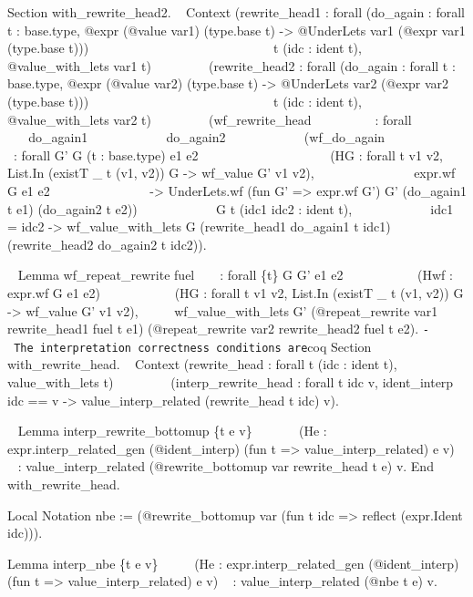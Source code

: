 \begin{itemize}
  Section with\_rewrite\_head2. ~ Context (rewrite\_head1 : forall
  (do\_again : forall t : base.type, @expr (@value var1) (type.base t)
  -\textgreater{} @UnderLets var1 (@expr var1 (type.base t))) ~ ~ ~ ~ ~
  ~ ~ ~ ~ ~ ~ ~ ~ ~ ~ ~ ~ t (idc : ident t), @value\_with\_lets var1 t)
  ~ ~ ~ ~ ~ (rewrite\_head2 : forall (do\_again : forall t : base.type,
  @expr (@value var2) (type.base t) -\textgreater{} @UnderLets var2
  (@expr var2 (type.base t))) ~ ~ ~ ~ ~ ~ ~ ~ ~ ~ ~ ~ ~ ~ ~ ~ ~ t (idc :
  ident t), @value\_with\_lets var2 t) ~ ~ ~ ~ ~ (wf\_rewrite\_head ~ ~
  ~ ~ ~ ~: forall ~ ~ ~ ~ ~ ~ ~ do\_again1 ~ ~ ~ ~ ~ ~ ~ do\_again2 ~ ~
  ~ ~ ~ ~ ~ (wf\_do\_again ~ ~ ~ ~ ~ ~ ~ ~: forall G' G (t : base.type)
  e1 e2 ~ ~ ~ ~ ~ ~ ~ ~ ~ ~ ~ ~ (HG : forall t v1 v2, List.In (existT \_
  t (v1, v2)) G -\textgreater{} wf\_value G' v1 v2), ~ ~ ~ ~ ~ ~ ~ ~ ~
  expr.wf G e1 e2 ~ ~ ~ ~ ~ ~ ~ ~ ~ -\textgreater{} UnderLets.wf (fun G'
  =\textgreater{} expr.wf G') G' (do\_again1 t e1) (do\_again2 t e2)) ~
  ~ ~ ~ ~ ~ ~ G t (idc1 idc2 : ident t), ~ ~ ~ ~ ~ ~ ~ idc1 = idc2
  -\textgreater{} wf\_value\_with\_lets G (rewrite\_head1 do\_again1 t
  idc1) (rewrite\_head2 do\_again2 t idc2)).

  ~ Lemma wf\_repeat\_rewrite fuel ~ ~ : forall \{t\} G G' e1 e2 ~ ~ ~ ~
  ~ ~ ~(Hwf : expr.wf G e1 e2) ~ ~ ~ ~ ~ ~ ~(HG : forall t v1 v2,
  List.In (existT \_ t (v1, v2)) G -\textgreater{} wf\_value G' v1 v2),
  ~ ~ ~ wf\_value\_with\_lets G' (@repeat\_rewrite var1 rewrite\_head1
  fuel t e1) (@repeat\_rewrite var2 rewrite\_head2 fuel t e2).
  \texttt{-\ The\ interpretation\ correctness\ conditions\ are}coq
  Section with\_rewrite\_head. ~ Context (rewrite\_head : forall t (idc
  : ident t), value\_with\_lets t) ~ ~ ~ ~ ~ (interp\_rewrite\_head :
  forall t idc v, ident\_interp idc == v -\textgreater{}
  value\_interp\_related (rewrite\_head t idc) v).

  ~ Lemma interp\_rewrite\_bottomup \{t e v\} ~ ~ ~ ~ (He :
  expr.interp\_related\_gen (@ident\_interp) (fun t =\textgreater{}
  value\_interp\_related) e v) ~ ~ : value\_interp\_related
  (@rewrite\_bottomup var rewrite\_head t e) v. End with\_rewrite\_head.

  Local Notation nbe := (@rewrite\_bottomup var (fun t idc
  =\textgreater{} reflect (expr.Ident idc))).

  Lemma interp\_nbe \{t e v\} ~ ~ ~ (He : expr.interp\_related\_gen
  (@ident\_interp) (fun t =\textgreater{} value\_interp\_related) e v) ~
  : value\_interp\_related (@nbe t e) v.


\end{itemize}
